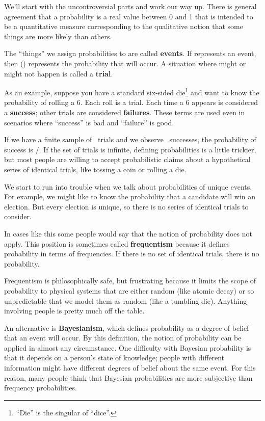 \documentclass[12pt]{book}
\begin{document}
We'll start with the uncontroversial parts and work our way up.  There
is general agreement that a probability is a real value between 0 and
1 that is intended to be a quantitative measure corresponding to the
qualitative notion that some things are more likely than others.

The ``things'' we assign probabilities to are called {\bf events}.  If
\E represents an event, then \Prob(\E) represents the probability that
\E will occur.  A situation where \E might or might not happen is
called a {\bf trial}.

As an example, suppose you have a standard six-sided
die\footnote{``Die'' is the singular of ``dice''.} and want to know
the probability of rolling a 6.  Each roll is a trial.
Each time a 6 appears is considered a {\bf success}; other trials are
considered {\bf failures}.  These terms are used even in scenarios
where ``success'' is bad and ``failure'' is good.

If we have a finite sample of \n~trials and we observe \s~successes,
the probability of success is \s/\n.  If the set of trials is
infinite, defining probabilities is a little trickier, but most people
are willing to accept probabilistic claims about a hypothetical series
of identical trials, like tossing a coin or rolling a die.

We start to run into trouble when we talk about probabilities of
unique events.  For example, we might like to know the probability
that a candidate will win an election.  But every election is unique,
so there is no series of identical trials to consider.

In cases like this some people would say that the notion of
probability does not apply.  This position is sometimes called {\bf
  frequentism} because it defines probability in terms of frequencies.
If there is no set of identical trials, there is no probability.

Frequentism is philosophically safe, but
frustrating because it limits the scope of probability to physical
systems that are either random (like atomic decay) or so unpredictable
that we model them as random (like a tumbling die).  Anything involving
people is pretty much off the table.

An alternative is {\bf Bayesianism}, which defines probability as
a degree of belief that an event will occur.  By this definition,
the notion of probability can be applied in almost any circumstance.
One difficulty with Bayesian probability is that it depends on
a person's state of knowledge; people with different information
might have different degrees of belief about the same event.  For
this reason, many people think that Bayesian probabilities are
more subjective than frequency probabilities.
\end{document}
